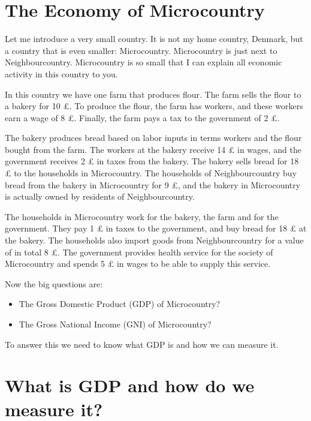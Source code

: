 \documentclass[]{book}
\providecommand{\tightlist}{%
  \setlength{\itemsep}{0pt}\setlength{\parskip}{0pt}}
\begin{document}
\hypertarget{the-economy-of-microcountry}{%
\section{The Economy of Microcountry}\label{the-economy-of-microcountry}}

Let me introduce a very small country. It is not my home country, Denmark, but a country that is even smaller: Microcountry. Microcountry is just next to Neighbourcountry. Microcountry is so small that I can explain all economic activity in this country to you.

In this country we have one farm that produces flour. The farm sells the flour to a bakery for 10 £. To produce the flour, the farm has workers, and these workers earn a wage of 8 £. Finally, the farm pays a tax to the government of 2 £.

The bakery produces bread based on labor inputs in terms workers and the flour bought from the farm. The workers at the bakery receive 14 £ in wages, and the government receives 2 £ in taxes from the bakery. The bakery sells bread for 18 £ to the households in Microcountry. The households of Neighbourcountry buy bread from the bakery in Microcountry for 9 £, and the bakery in Microcountry is actually owned by residents of Neighbourcountry.

The households in Microcountry work for the bakery, the farm and for the government. They pay 1 £ in taxes to the government, and buy bread for 18 £ at the bakery. The households also import goods from Neighbourcountry for a value of in total 8 £. The government provides health service for the society of Microcountry and spends 5 £ in wages to be able to supply this service.

Now the big questions are:

\begin{itemize}
\tightlist
\item
  The Gross Domestic Product (GDP) of Microcountry?
\item
  The Gross National Income (GNI) of Microcountry?
\end{itemize}

To answer this we need to know what GDP is and how we can measure it.

\hypertarget{what-is-gdp-and-how-do-we-measure-it}{%
\section{What is GDP and how do we measure it?}\label{what-is-gdp-and-how-do-we-measure-it}}
\end{document}
